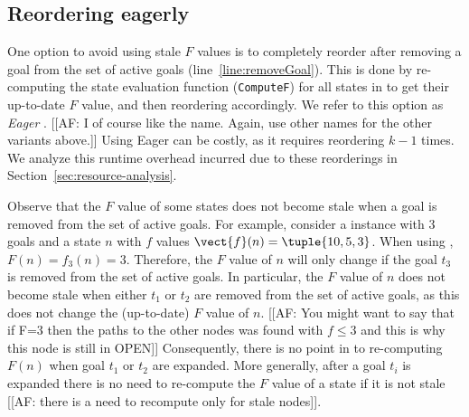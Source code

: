 
\subsection{Reordering \open eagerly}
\label{sec:eager}
One option to avoid using stale $F$ values is to completely reorder \open after removing a goal from the set of active goals (line~\ref{line:removeGoal}).
This is done by re-computing the state evaluation function (\texttt{ComputeF}) for all states in \open to get their up-to-date $F$ value, and then reordering \open accordingly.
We refer to this option as \emph{Eager \kastar}. [[AF: I of course like the name. Again, use other names for the other variants above.]]
Using Eager \kastar can be costly, as it requires reordering \open $k-1$ times. 
We analyze this runtime overhead incurred due to these reorderings in Section~\ref{sec:resource-analysis}.

Observe that the $F$ value of some states does not become stale when a goal is removed from the set of active goals.
For example, consider a \kgs instance with 3 goals and a state $n$ with $f$ values $\vect{f}(n)= \tuple{10, 5, 3}$.
When using \kastarmin, $F(n)=f_3(n)=3$.
Therefore, the $F$ value of $n$ will only change if the goal $t_3$ is removed from the set of active goals.
In particular, the $F$ value of $n$ does not become stale when either $t_1$ or $t_2$ are removed from the set of active goals, as this does not change the (up-to-date) $F$ value of $n$. [[AF: You might want to say that if F=3 then the paths to the other nodes was found with $f \leq 3$ and this is why this node is still in OPEN]]
Consequently, there is no point in to re-computing $F(n)$ when goal $t_1$ or $t_2$ are expanded. More generally, after a goal $t_i$ is expanded there is no need to re-compute the $F$ value of a state if it is not stale  [[AF: there is a need to recompute only for stale nodes]]. %

